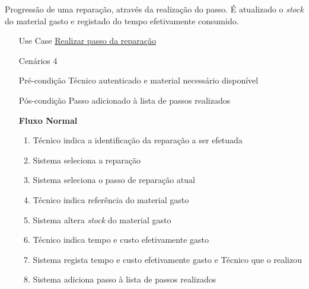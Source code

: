 \documentclass[../relatorio.tex]{subfiles}
\begin{document}
Progressão de uma reparação, através da realização do passo.
É atualizado o \textit{stock} do material gasto e registado do tempo efetivamente consumido.
\begin{itemize}
    \item[Use Case] {\underline{Realizar passo da reparação}}
    \item[Cenários] {4}
    \item[Pré-condição] {Técnico autenticado e material necessário disponível}
    \item[Pós-condição] {Passo adicionado à lista de passos realizados}
          \begin{flushleft}
              \textbf{Fluxo Normal}
          \end{flushleft}
          \begin{enumerate}
              \item Técnico indica a identificação da reparação a ser efetuada 
              \item Sistema seleciona a reparação
              \item Sistema seleciona o passo de reparação atual
              \item Técnico indica referência do material gasto
              \item Sistema altera \textit{stock} do material gasto
              \item Técnico indica tempo e custo efetivamente gasto 
              \item Sistema regista tempo e custo efetivamente gasto e Técnico que o realizou
              \item Sistema adiciona passo à lista de passos realizados
          \end{enumerate}
\end{itemize}
\end{document}
